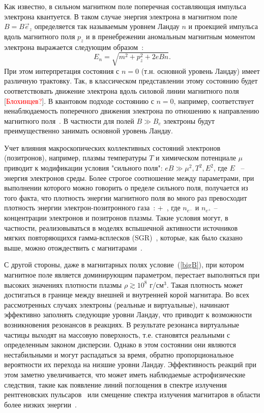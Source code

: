 Как известно, в сильном магнитном поле поперечная составляющая импульса электрона квантуется. В таком случае энергия электрона  в магнитном поле $B=B \vec{e}_z$ определяется так называемым уровнем Ландау $n$ и проекцией импульса вдоль магнитного поля $p_z$ и в пренебрежении аномальным магнитным моментом электрона выражается следующим образом~\cite{Sokolov:1968}: 
\begin{equation}
E_n = \sqrt{m^2+p_z^2+2 e B n}.
\end{equation}
%
При этом интерпретация состояния с $n=0$ (т.н. основной уровень Ландау) имеет 
различную трактовку. Так, в классическом представлении этому состоянию будет 
соответствовать движение электрона вдоль силовой линии магнитного поля 
[\textcolor{red}{Блохинцев?}]. В квантовом подходе состоянию с $n=0$, например, 
соответствует ненаблюдаемость поперечного движения электрона по отношению к 
направлению магнитного поля~\cite{KM_Book_2013}. В частности для полей $B\gg 
B_e$ электроны будут преимущественно занимать основной уровень Ландау. 

Учет влияния макроскопических коллективных состояний электронов (позитронов), например, плазмы температуры $T$ и химическом потенциале $\mu$ приводит к модификации условия "сильного поля": $eB \gg \mu^2, T^2, E^2$, где $E$~\cite{Borisov:1997} -- энергия электронов среды. Более строгое соотношение между параметрами, при выполнении которого можно говорить о пределе сильного поля, получается из того факта, что плотность энергии магнитного поля во много раз превосходит плотность энергии электрон-позитронного газа~\cite{KuzMih:2000}: 
%
\beq
\label{bigB}
 \gg {} + \,,
\eeq 
%
\noindent где $n_{e^{-}}$ и $n_{e^{+}}$ -- концентрации электронов и позитронов плазмы. Такие условия могут, в частности, реализовываться в моделях вспышечной активности источников мягких повторяющихся гамма-всплесков 
(SGR)~\cite{Duncan:1995, Bisnovatyi:1979}, которые, как было сказано выше, можно отождествить с магнитарами~\cite{Kouveliotou:1998ze,Kouveliotou:1998fd,Gavriil:2002mc,Ibrahim:2002zw,Ibrahim:2002zy,Olausen:2014}.

С другой стороны, даже в магнитарных полях условие~(\ref{bigB}), при котором 
магнитное поле является доминирующим параметром, перестает выполняться при 
высоких значениях плотности плазмы $\rho \gtrsim 10^8$ г/см$^3$. Такая 
плотность может достигаться в  границе между внешней и внутренней корой 
магнитара. Во всех рассмотренных случаях электроны (реальные и виртуальные), начинают 
эффективно заполнять следующие уровни Ландау, что приводит к возможности 
возникновения резонансов в реакциях.
 В результате резонанса виртуальные частицы выходят на массовую поверхность, т.е. становятся реальными с определенным законом дисперсии. 
Однако в этом состоянии они являются нестабильными и могут распадаться за время, обратно пропорциональное вероятности их перехода на низшие уровни Ландау. Эффективность реакций при этом заметно увеличивается, что 
может иметь наблюдаемые астрофизические следствия, такие как появление линий 
поглощения в спектре излучения рентгеновских пульсаров~\cite{Truemper1978} или 
смещение спектра излучения магнитаров в области более низких 
энергии~\cite{Lyutikov:2002}.

